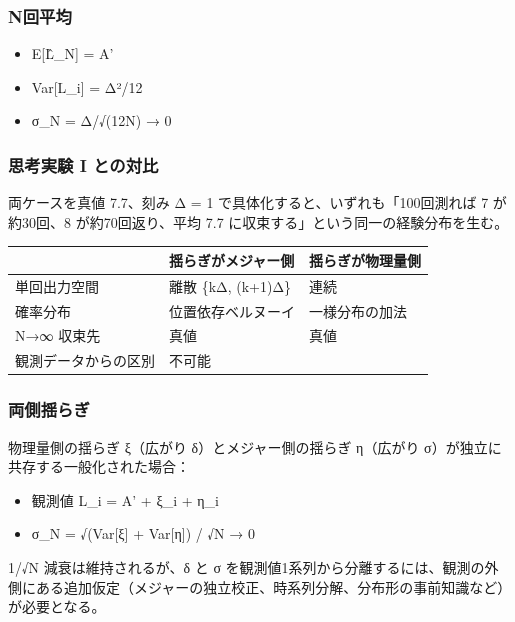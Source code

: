 \documentclass[
  11pt,
]{ltjsarticle}
\newcounter{none} %
\providecommand{\tightlist}{%
  \setlength{\itemsep}{0pt}\setlength{\parskip}{0pt}}
\begin{document}
\subsubsection{N回平均}\label{nux56deux5e73ux5747}

\begin{itemize}
\tightlist
\item
  E{[}L̂\_N{]} = A'
\item
  Var{[}L\_i{]} = Δ²/12
\item
  σ\_N = Δ/√(12N) → 0
\end{itemize}

\subsubsection{思考実験 I
との対比}\label{ux601dux8003ux5b9fux9a13-i-ux3068ux306eux5bfeux6bd4}

両ケースを真値 7.7、刻み Δ = 1 で具体化すると、いずれも「100回測れば 7
が約30回、8 が約70回返り、平均 7.7
に収束する」という同一の経験分布を生む。

{\def\LTcaptype{none} %
\begin{longtable}[]{@{}lll@{}}
\toprule\noalign{}
& 揺らぎがメジャー側 & 揺らぎが物理量側 \\
\midrule\noalign{}
\endhead
\bottomrule\noalign{}
\endlastfoot
単回出力空間 & 離散 \{kΔ, (k+1)Δ\} & 連続 \\
確率分布 & 位置依存ベルヌーイ & 一様分布の加法 \\
N→∞ 収束先 & 真値 & 真値 \\
観測データからの区別 & 不可能 & \\
\end{longtable}
}

\subsubsection{両側揺らぎ}\label{ux4e21ux5074ux63faux3089ux304e}

物理量側の揺らぎ ξ（広がり δ）とメジャー側の揺らぎ η（広がり
σ）が独立に共存する一般化された場合：

\begin{itemize}
\tightlist
\item
  観測値 L\_i = A' + ξ\_i + η\_i
\item
  σ\_N = √(Var{[}ξ{]} + Var{[}η{]}) / √N → 0
\end{itemize}

1/√N 減衰は維持されるが、δ と σ
を観測値1系列から分離するには、観測の外側にある追加仮定（メジャーの独立校正、時系列分解、分布形の事前知識など）が必要となる。
\end{document}
